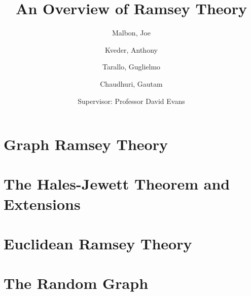 \documentclass{beamer}
\author{
  Malbon, Joe\\
  \and
  Kveder, Anthony\\
  \and
  Tarallo, Guglielmo\\
  \and
  Chaudhuri, Gautam\\
  \and
  Supervisor: Professor David Evans
}
\title{An Overview of Ramsey Theory}
\theoremstyle{BreakBold}
\begin{document}
\frame{\titlepage}

% 

\section{Graph Ramsey Theory}


\section{The Hales-Jewett Theorem and Extensions}


\section{Euclidean Ramsey Theory}


\section{The Random Graph}

\end{document}
